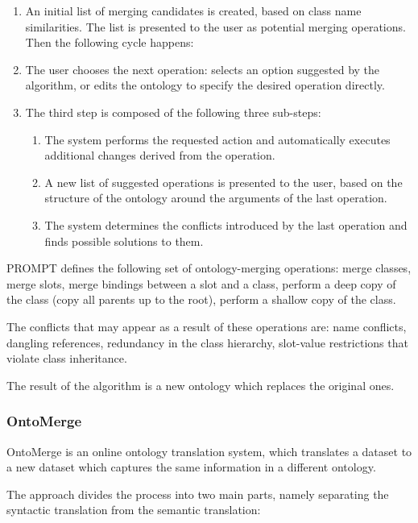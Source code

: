 \begin{enumerate}
\item An initial list of merging candidates is created, based on class
name similarities. The list is presented to the user as potential
merging operations. Then the following cycle happens: 
\item The user chooses the next operation: selects an option suggested
by the algorithm, or edits the ontology to specify the desired
operation directly. 
\item The third step is composed of the following three sub-steps: 

\begin{enumerate}
\item The system performs the requested action and automatically
executes additional changes derived from the operation. 
\item A new list of suggested operations is presented to the user, based
on the structure of the ontology around the arguments of the last
operation. 
\item The system determines the conflicts introduced by the last
operation and finds possible solutions to them. 
\end{enumerate}
\end{enumerate}
PROMPT defines the following set of ontology-merging operations: merge
classes, merge slots, merge bindings between a slot and a class,
perform a deep copy of the class (copy all parents up to the root),
perform a shallow copy of the class. 

The conflicts that may appear as a result of these operations are: name
conflicts, dangling references, redundancy in the class hierarchy,
slot-value restrictions that violate class inheritance. 

The result of the algorithm is a new ontology which replaces the
original ones. 

\subsubsection{OntoMerge}
OntoMerge \cite{dou2002ontology_translation} is an online ontology translation system,
which translates a dataset to a new dataset which captures the same
information in a different ontology. 

The approach divides the process into two main parts, namely separating
the syntactic translation from the semantic translation: 

